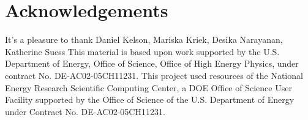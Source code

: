 \documentclass[12pt, letterpaper, preprint, comicneue]{aastex63}
\begin{document}


 





\section*{Acknowledgements}
It's a pleasure to thank
    Daniel Kelson, 
    Mariska Kriek, 
    Desika Narayanan,
    Katherine Suess 
This material is based upon work supported by the U.S. Department of Energy,
Office of Science, Office of High Energy Physics, under contract No.
DE-AC02-05CH11231.  This project used resources of the National Energy Research
Scientific Computing Center, a DOE Office of Science User Facility supported by
the Office of Science of the U.S.  Department of Energy under Contract No.
DE-AC02-05CH11231. 

\appendix
 
 


 
\end{document}
